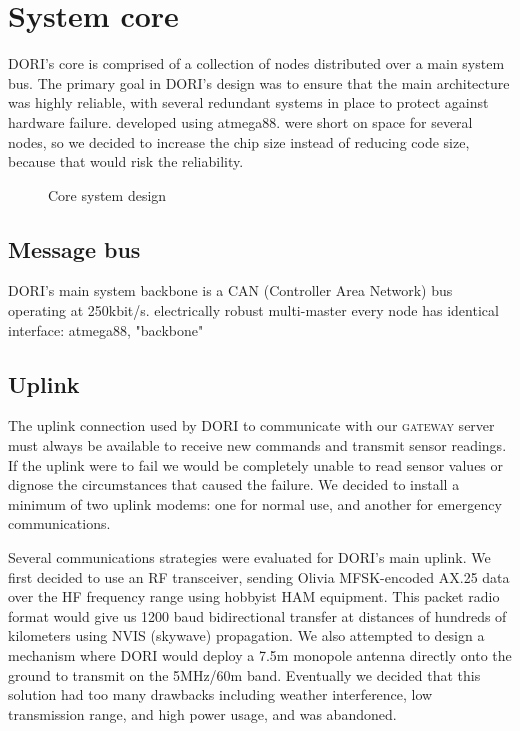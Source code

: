 \documentclass[12pt]{article}
\begin{document}
\section{System core}
DORI's core is comprised of a collection of nodes distributed over a main system bus. The primary goal in DORI's design was to ensure that the main architecture was highly reliable, with several redundant systems in place to protect against hardware failure. 
developed using atmega88. were short on space for several nodes, so we decided to increase the chip size instead of reducing code size, because that would risk the reliability.

\begin{figure}[h]
    \centering
    
    \caption{Core system design}
\end{figure}

    \subsection{Message bus}
    DORI's main system backbone is a CAN (Controller Area Network) bus operating at 250kbit/s. 
electrically robust
multi-master
every node has identical interface: atmega88, 
"backbone"

    \subsection{Uplink}
    The uplink connection used by DORI to communicate with our \textsc{gateway} server must always be available to receive new commands and transmit sensor readings. If the uplink were to fail we would be completely unable to read sensor values or dignose the circumstances that caused the failure. We decided to install a minimum of two uplink modems: one for normal use, and another for emergency communications.

    Several communications strategies were evaluated for DORI's main uplink. We first decided to use an RF transceiver, sending Olivia MFSK-encoded AX.25 data over the HF frequency range using hobbyist HAM equipment\cite{olivia-mfsk}. This packet radio format would give us 1200 baud bidirectional transfer at distances of hundreds of kilometers using NVIS (skywave) propagation. We also attempted to design a mechanism where DORI would deploy a 7.5m monopole antenna directly onto the ground to transmit on the 5MHz/60m band. Eventually we decided that this solution had too many drawbacks including weather interference, low transmission range, and high power usage, and was abandoned.
\end{document}
